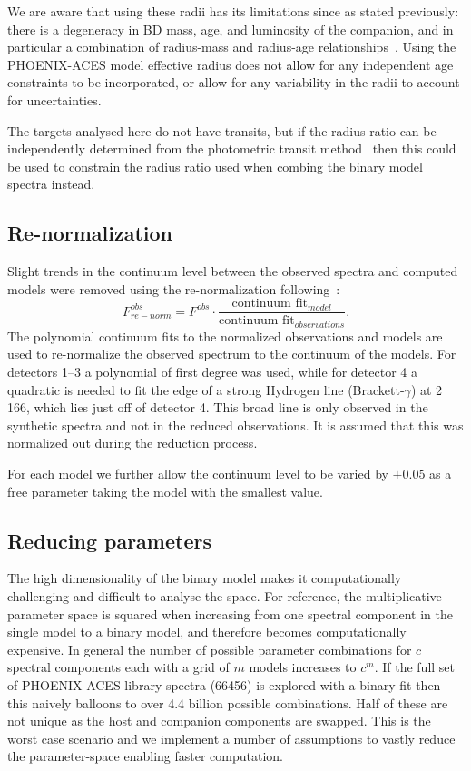 We are aware that using these radii has its limitations since as stated previously: there is a degeneracy in {BD} mass, age, and luminosity of the companion, and in particular a combination of radius-mass and radius-age relationships~\citep{sorahana_radii_2013}.
Using the {PHOENIX-ACES} model effective radius does not allow for any independent age constraints to be incorporated, or allow for any variability in the radii to account for uncertainties.

The targets analysed here do not have transits, but if the radius ratio can be independently determined from the photometric transit method~\citep{deeg_photometric_1998} then this could be used to constrain the radius ratio used when combing the binary model spectra instead.


\subsection{Re-normalization}
\label{subsec:renorm}
Slight trends in the continuum level between the observed spectra and computed models were removed using the re-normalization following~\citet{passegger_fundamental_2016}:
\begin{equation}
F^{obs}_{re-norm} = F^{obs} \cdot \frac{\textrm{continuum fit}_{model}}{\textrm{continuum fit}_{observations}}.
\end{equation}
The polynomial continuum fits to the normalized observations and models are used to re-normalize the observed spectrum to the continuum of the models.
For detectors 1--3 a polynomial of first degree was used, while for detector 4 a quadratic is needed to fit the edge of a strong Hydrogen line (Brackett-\(\gamma\)) at 2\,166\nm{}, which lies just off of detector 4.
This broad line is only observed in the synthetic spectra and not in the reduced observations.
It is assumed that this was normalized out during the reduction process.

For each model we further allow the continuum level to be varied by \(\pm 0.05\) as a free parameter taking the model with the smallest \textchisquared{} value.


\subsection{Reducing parameters}
\label{subsec:reduce-params}
The high dimensionality of the binary model makes it computationally challenging and difficult to analyse the \textchisquared{} space.
For reference, the multiplicative parameter space is squared when increasing from one spectral component in the single model to a binary model, and therefore becomes computationally expensive.
In general the number of possible parameter combinations for \(c\) spectral components each with a grid of \(m\) models increases to \(c^m\).
If the full set of {PHOENIX-ACES} library spectra (66456) is explored with a binary fit then this naively balloons to over 4.4 billion possible combinations.
Half of these are not unique as the host and companion components are swapped.
This is the worst case scenario and we implement a number of assumptions to vastly reduce the parameter-space enabling faster computation.

